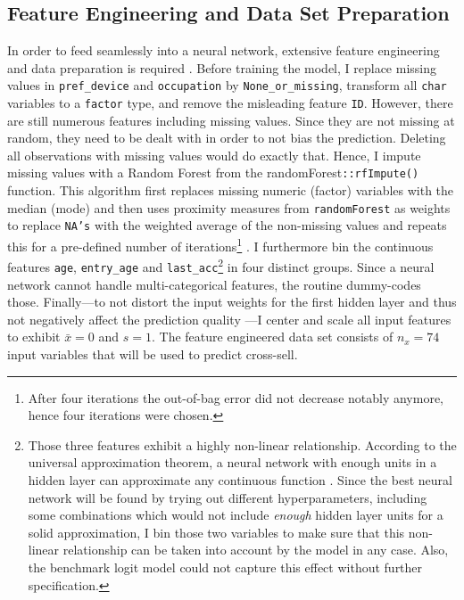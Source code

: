 \documentclass[12pt,a4paper]{article}
\newcommand{\pkg}[1]{{\normalfont\fontseries{b}\selectfont #1}}
\let\code=\texttt
\begin{document}
\subsection{Feature Engineering and Data Set Preparation}
In order to feed seamlessly into a neural network, extensive feature engineering and data preparation is required \citep{hastieElementsStatisticalLearning2017}.
Before training the model, I replace missing values in \code{pref\_device} and \code{occupation} by \code{None\_or\_missing}, transform all \code{char} variables to a \code{factor} type, and remove the misleading feature \code{ID}.
However, there are still numerous features including missing values. Since they are not missing at random, they need to be dealt with in order to not
bias the prediction.
Deleting all observations with missing values would do exactly that.
Hence, I impute missing values with a Random Forest from the \pkg{randomForest}\code{::rfImpute()} function.
This algorithm first replaces missing numeric (factor) variables with the median (mode) and then uses proximity measures from \code{randomForest}
as weights to replace \code{NA's} with the weighted average of the non-missing values and repeats this for a
pre-defined number of iterations\footnote{After four iterations the out-of-bag error did not decrease notably anymore, hence four iterations were chosen.}
 \citep{liawClassificationRegressionRandomForest2002}.
I furthermore bin the continuous features \code{age}, \code{entry\_age} and \code{last\_acc}\footnote{Those three features exhibit a highly
non-linear relationship. According to the universal approximation theorem, a 
neural network with enough units in a hidden layer can approximate any continuous function \citep{hornikApproximationCapabilitiesMultilayer1991}.
Since the best neural network will be found by trying out different hyperparameters, including some combinations which would not include \textit{enough}
hidden layer units for a solid approximation, I bin
those two variables to make sure that this non-linear relationship can be taken into account by the model in any case. Also, the benchmark logit model
could not capture this effect without further specification.}
in four distinct groups.
Since a neural network cannot handle multi-categorical features, the routine dummy-codes those.
Finally---to not distort the input weights for the first hidden layer and thus not negatively affect the prediction quality 
\citep[pp. 398]{hastieElementsStatisticalLearning2017}---I center and scale all input features to exhibit $\bar{x}=0$ and $s=1$.
The feature engineered data set consists of $n_x = 74$ input variables that will be used to predict cross-sell. 
\end{document}
